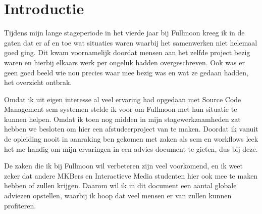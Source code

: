 \setcounter{chapter}{0}
\chapter{Introductie}
  
  Tijdens mijn lange stageperiode in het vierde jaar bij Fullmoon kreeg ik in de gaten dat er af en toe wat situaties waren waarbij het samenwerken niet helemaal goed ging. Dit kwam voornamelijk doordat mensen aan het zelfde project bezig waren en hierbij elkaars werk per ongeluk hadden overgeschreven. Ook was er geen goed beeld wie nou precies waar mee bezig was en wat ze gedaan hadden, het overzicht ontbrak.
  
  Omdat ik uit eigen interesse al veel ervaring had opgedaan met Source Code Management {\sc scm} systemen stelde ik voor om Fullmoon met hun situatie te kunnen helpen. Omdat ik toen nog midden in mijn stagewerkzaamheden zat hebben we besloten om hier een afstudeerproject van te maken. Doordat ik vanuit de opleiding nooit in aanraking ben gekomen met zaken als {\sc scm} en workflows leek het me handig om mijn ervaringen in een advies document te gieten, dus bij deze.
  
  De zaken die ik bij Fullmoon wil verbeteren zijn veel voorkomend, en ik weet zeker dat andere MKBers en Interactieve Media studenten hier ook mee te maken hebben of zullen krijgen. Daarom wil ik in dit document een aantal globale adviezen opstellen, waarbij ik hoop dat veel mensen er van zullen kunnen profiteren.
  